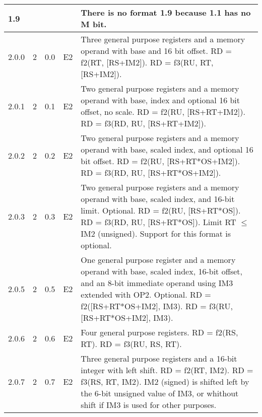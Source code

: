 \documentclass[forwardcom.tex]{subfiles}
\begin{document}
\begin{longtable} {|p{10mm}|p{6mm}|p{9mm}|p{7mm}|p{80mm}|}
\hline
1.9 &  &  &  & There is no format 1.9 because 1.1 has no M bit.\\

\hline
2.0.0 & 2 & 0.0  & E2 & Three general purpose registers and a memory operand with base and 16 bit offset.\newline 
RD = f2(RT, [RS+IM2]). \newline 
RD = f3(RU, RT, [RS+IM2]).\\

\hline
2.0.1 & 2 & 0.1  & E2 & Two general purpose registers and a memory operand with base, index and optional 16 bit offset, no scale.\newline  
RD = f2(RU, [RS+RT+IM2]).\newline  
RD = f3(RD, RU, [RS+RT+IM2]). \\

\hline
2.0.2 & 2 & 0.2  & E2 & Two general purpose registers and a memory operand with base,  scaled index, and optional 16 bit offset.\newline   
RD = f2(RU, [RS+RT*OS+IM2]). \newline 
RD = f3(RD, RU, [RS+RT*OS+IM2]). \\

\hline
2.0.3 & 2 & 0.3  & E2 & Two general purpose registers and a memory operand with base, scaled index, and 16-bit limit. Optional. \newline 
RD = f2(RU, [RS+RT*OS]). \newline 
RD = f3(RD, RU, [RS+RT*OS]). \newline
Limit RT $\leq$ IM2 (unsigned).\newline 
Support for this format is optional. \\

\hline
2.0.5 & 2 & 0.5  & E2 & One general purpose register and a memory operand with base, scaled index, 16-bit offset, and an 8-bit immediate operand using IM3 extended with OP2.  Optional. \newline 
RD = f2([RS+RT*OS+IM2], IM3). \newline 
RD = f3(RU, [RS+RT*OS+IM2], IM3). \\ 

\hline
2.0.6 & 2 & 0.6  & E2 & Four general purpose registers.\newline 
RD = f2(RS, RT). \newline 
RD = f3(RU, RS, RT).\\

\hline
2.0.7 & 2 & 0.7  & E2 & Three general purpose registers and a 16-bit integer with left shift.\newline 
RD = f2(RT, IM2). \newline 
RD = f3(RS, RT, IM2).\newline 
IM2 (signed) is shifted left by the 6-bit unsigned value of IM3, or whithout shift if IM3 is used for other purposes. \\


\end{longtable}
\end{document}
